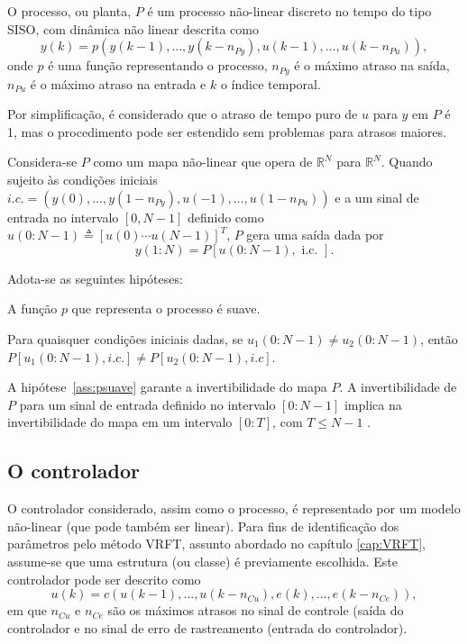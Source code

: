 O processo, ou planta, $P$ é um processo não-linear discreto no tempo do tipo SISO, com dinâmica não linear descrita como
\begin{equation}
   y(k)=p\left(y(k-1), \ldots, y(k-n_{P y}), u(k-1), \ldots, u(k-n_{P u})\right),
   \label{eq:yknl}
\end{equation}
onde $p$ é uma função representando o processo, $n_{P y}$ é o máximo atraso na saída, $n_{P u}$ é o máximo atraso na entrada e $k$ o índice temporal.

Por simplificação, é considerado que o atraso de tempo puro de $u$ para $y$ em $P$ é 1, mas o procedimento pode ser estendido sem problemas para atrasos maiores.

Considera-se $P$ como um mapa não-linear que opera de $\mathbb{R}^{N}$ para $\mathbb{R}^{N}$. Quando sujeito às condições iniciais $i.c.= (y(0), \ldots, y(1-n_{P y}), u(-1), \ldots, u(1-n_{P u}) )$ e a um sinal de entrada no intervalo $[0, N-1]$ definido como $u(0{:}N-1) \triangleq [u(0) \cdots u(N-1)]^{T}$, $P$ gera uma saída dada por
\begin{equation}
   y(1{:}N) = P[u(0{:}N-1), \text { i.c. }].
\label{eq:Pnl}
\end{equation}

Adota-se as seguintes hipóteses:
\begin{assum}\label{ass:psuave}
   A função $p$ que representa o processo é suave.
\end{assum}
\begin{assum}\label{ass:invert}
   Para quaisquer condições iniciais dadas, se $u_{1}(0{:}N-1) \neq u_{2}(0{:} N-1)$, então $P\left[u_{1}(0{:} N-1), i . c .\right] \neq P\left[u_{2}(0{:} N-1), i . c\right]$.
\end{assum}

A hipótese~\ref{ass:psuave} garante a invertibilidade do mapa $P$. A invertibilidade de $P$ para um sinal de entrada definido no intervalo $\left[ 0{:}N-1 \right]$
implica na invertibilidade do mapa em um intervalo $[0{:}T]$, com $T\le N-1$ \citep{campi2004}.  


\subsection{O controlador}%
\label{sub:o_controlador}

O controlador considerado, assim como o processo, é representado por um modelo não-linear (que pode também ser linear). Para fins de identificação dos parâmetros pelo método VRFT, assunto abordado no capítulo \ref{cap:VRFT}, assume-se que uma estrutura (ou classe) é previamente escolhida. Este controlador pode ser descrito como
\begin{equation}
   u(k)=c\left(u(k-1), \ldots, u(k-n_{C u}), e(k), \ldots, e(k-n_{C e})\right),
\label{eq:uknl}
\end{equation}
em que $n_{Cu}$ e $n_{Ce}$ são os máximos atrasos no sinal de controle (saída do controlador e no sinal de erro de rastreamento (entrada do controlador).


